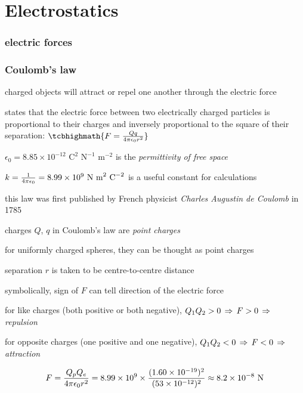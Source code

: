 \chapter{Electrostatics}

\subsection{electric forces}

\subsection{Coulomb's law}

charged objects will attract or repel one another through the electric force

\begin{ilight}
	 states that the electric force between two electrically charged particles is proportional to their charges and inversely proportional to the square of their separation: $\tcbhighmath{F = \frac{Qq}{4\pi\epsilon_0 r^2}}$
\end{ilight}

$\epsilon_0 = 8.85 \times 10^{-12} \text{ C}^2 \text{ N}^{-1} \text{ m}^{-2}$ is the \emph{permittivity of free space}

$k = \frac{1}{4\pi\epsilon_0} = 8.99 \times 10^9 \text{ N m}^2 \text{ C}^{-2}$ is a useful constant for calculations

this law was first published by French physicist \emph{Charles Augustin de Coulomb} in 1785

\cmt charges $Q$, $q$ in Coulomb's law are \emph{point charges}

\cmt for uniformly charged spheres, they can be thought as point charges

separation $r$ is taken to be centre-to-centre distance

\cmt symbolically, sign of $F$ can tell direction of the electric force

for like charges (both positive or both negative), $Q_1Q_2>0 \, \Rightarrow \, F>0 \, \Rightarrow \,$  \emph{repulsion}

for opposite charges (one positive and one negative), $Q_1Q_2<0 \, \Rightarrow \, F<0 \, \Rightarrow \,$  \emph{attraction}


\begin{soln}\begin{equation*}
	F = \frac{Q_p Q_e}{4\pi\epsilon_0 r^2} = 8.99\times10^9 \times \frac{(1.60\times10^{-19})^2}{(53\times10^{-12})^2} \approx 8.2 \times 10^{-8} \text{ N} 
\end{equation*}
\end{soln}

